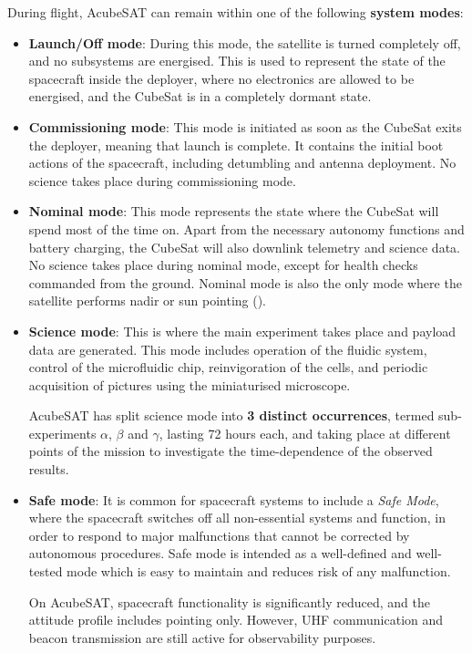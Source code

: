 \documentclass[a4paper,nobib]{tufte-book}
\begin{document}
During flight, AcubeSAT can remain within one of the following \textbf{system modes}:\autocite{MDO}
\begin{itemize}
	\item \textbf{Launch/Off mode}: During this mode, the satellite is turned completely off, and no subsystems are energised. This is used to represent the state of the spacecraft inside the deployer, where no electronics are allowed to be energised,\autocite[req. 3.3.3]{CDS13} and the CubeSat is in a completely dormant state.
	
	\item \textbf{Commissioning mode}: This mode is initiated as soon as the CubeSat exits the deployer, meaning that launch is complete. It contains the initial boot actions of the spacecraft, including detumbling and antenna deployment. No science takes place during commissioning mode.
	
	\item \textbf{Nominal mode}: This mode represents the state where the CubeSat will spend most of the time on. Apart from the necessary autonomy functions and battery charging, the CubeSat will also downlink telemetry and science data. No science takes place during nominal mode, except for health checks commanded from the ground. Nominal mode is also the only mode where the satellite performs nadir or sun pointing ().
	
	\item \textbf{Science mode}: This is where the main experiment takes place and payload data are generated. This mode includes operation of the fluidic system, control of the microfluidic chip, reinvigoration of the cells, and periodic acquisition of pictures using the miniaturised microscope.
	
	AcubeSAT has split science mode into \textbf{3 distinct occurrences}, termed sub-experiments \(\alpha\), \(\beta\) and \(\gamma\), lasting 72 hours each, and taking place at different points of the mission to investigate the time-dependence of the observed results.
	
	\item \textbf{Safe mode}: It is common for spacecraft systems to include a \emph{Safe Mode},\autocite[385]{aguirre_introduction_space_2013} where the spacecraft switches off all non-essential systems and function, in order to respond to major malfunctions that cannot be corrected by autonomous procedures. Safe mode is intended as a well-defined and well-tested mode which is easy to maintain and reduces risk of any malfunction.
	
	On AcubeSAT, spacecraft functionality is significantly reduced, and the attitude profile includes pointing only. However, \ac{UHF} communication and beacon transmission are still active for observability purposes.
\end{itemize}
\end{document}
